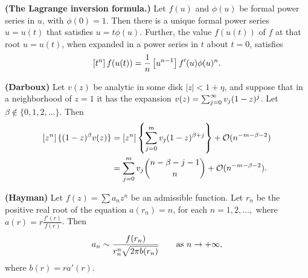 \begin{theorem} \label{thm:lif}
    \textbf{(The Lagrange inversion formula.)} Let $f(u)$ and $\phi(u)$ be formal power series in $u$, with $\phi(0)=1$. Then there is a unique formal power series $u=u(t)$ that satisfies $u=t\phi(u)$. Further, the value $f(u(t))$ of $f$ at that root $u=u(t)$, when expanded in a power series in $t$ about $t=0$, satisfies
    \[
        \coeff{t^n} {f(u(t))} = \frac{1}{n}\coeff{u^{n-1}} {f'(u)\phi(u)^n}.
    \]
\end{theorem}
\begin{theorem} \label{thm:darboux}
    \textbf{(Darboux)} Let $v(z)$ be analytic in some disk $|z|<1+\eta$, and suppose that in a neighborhood of $z=1$ it has the expansion $v(z) = \bsum[j] v_j(1-z)^j$. Let $\beta\notin\{0,1,2,\ldots\}$. Then
    \begin{align*}
        \coeff{z^n}\{(1-z)^\beta v(z)\} &= \coeff{z^n} \left\{\sum_{j=0}^m v_j(1-z)^{\beta+j}\right\} + \mathcal{O}(n^{-m-\beta-2}) \\
        &= \sum_{j=0}^m v_j \binom{n-\beta -j-1}{n} + \mathcal{O}(n^{-m-\beta-2}).
    \end{align*}
\end{theorem}
\begin{theorem} \label{thm:hayman}
    \textbf{(Hayman)} Let $f(z)=\sum a_nz^n$ be an admissible function. Let $r_n$ be the positive real root of the equation $a(r_n)=n$, for each $n=1,2,\ldots,$ where $a(r)=r \frac{f'(r)}{f(r)}$. Then
    \[
        a_n \sim \frac{f(r_n)}{r_n^n\sqrt{2\pi b(r_n)}} \qquad \textnormal{as $n\to+\infty,$}
    \]
    where $b(r)=ra'(r)$.
\end{theorem}
